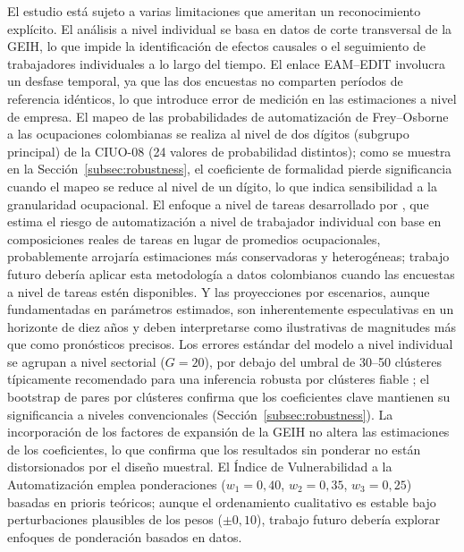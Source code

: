 \documentclass{article}
\begin{document}
El estudio est\'a sujeto a varias limitaciones que ameritan un reconocimiento expl\'icito. El an\'alisis a nivel individual se basa en datos de corte transversal de la GEIH, lo que impide la identificaci\'on de efectos causales o el seguimiento de trabajadores individuales a lo largo del tiempo. El enlace EAM--EDIT involucra un desfase temporal, ya que las dos encuestas no comparten per\'iodos de referencia id\'enticos, lo que introduce error de medici\'on en las estimaciones a nivel de empresa. El mapeo de las probabilidades de automatizaci\'on de Frey--Osborne a las ocupaciones colombianas se realiza al nivel de dos d\'igitos (subgrupo principal) de la CIUO-08 (24 valores de probabilidad distintos); como se muestra en la Secci\'on~\ref{subsec:robustness}, el coeficiente de formalidad pierde significancia cuando el mapeo se reduce al nivel de un d\'igito, lo que indica sensibilidad a la granularidad ocupacional. El enfoque a nivel de tareas desarrollado por \cite{arntz2016}, que estima el riesgo de automatizaci\'on a nivel de trabajador individual con base en composiciones reales de tareas en lugar de promedios ocupacionales, probablemente arrojar\'ia estimaciones m\'as conservadoras y heterog\'eneas; trabajo futuro deber\'ia aplicar esta metodolog\'ia a datos colombianos cuando las encuestas a nivel de tareas est\'en disponibles. Y las proyecciones por escenarios, aunque fundamentadas en par\'ametros estimados, son inherentemente especulativas en un horizonte de diez a\~nos y deben interpretarse como ilustrativas de magnitudes m\'as que como pron\'osticos precisos. Los errores est\'andar del modelo a nivel individual se agrupan a nivel sectorial ($G = 20$), por debajo del umbral de 30--50 cl\'usteres t\'ipicamente recomendado para una inferencia robusta por cl\'usteres fiable \cite{autor2013}; el bootstrap de pares por cl\'usteres confirma que los coeficientes clave mantienen su significancia a niveles convencionales (Secci\'on~\ref{subsec:robustness}). La incorporaci\'on de los factores de expansi\'on de la GEIH no altera las estimaciones de los coeficientes, lo que confirma que los resultados sin ponderar no est\'an distorsionados por el dise\~no muestral. El \'Indice de Vulnerabilidad a la Automatizaci\'on emplea ponderaciones ($w_1 = 0{,}40$, $w_2 = 0{,}35$, $w_3 = 0{,}25$) basadas en prioris te\'oricos; aunque el ordenamiento cualitativo es estable bajo perturbaciones plausibles de los pesos ($\pm 0{,}10$), trabajo futuro deber\'ia explorar enfoques de ponderaci\'on basados en datos.
\end{document}
